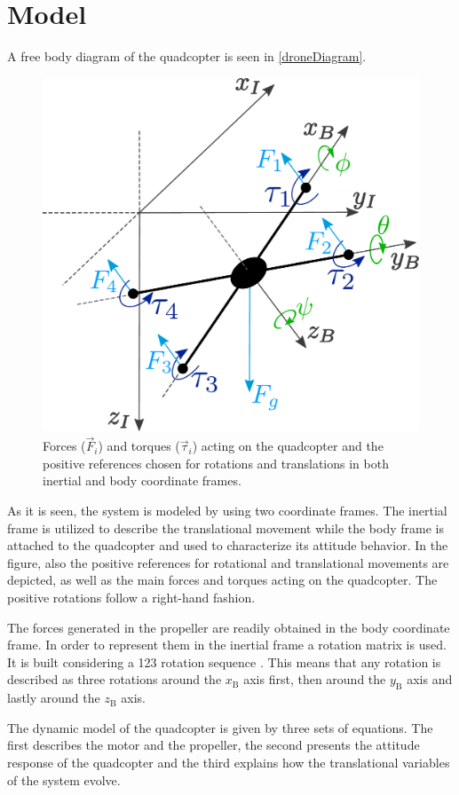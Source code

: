\section{Model}\label{sec:model}
A free body diagram of the quadcopter is seen in \autoref{droneDiagram}. 
\begin{figure}[H]
	\centering
	\includegraphics[width=.4\textwidth]{figures/droneDiagram}
	\caption{Forces ($\vec{F}_i$) and torques ($\vec{\tau}_i$) acting on the quadcopter and the positive references chosen for rotations and translations in both inertial and body coordinate frames.}
	\label{droneDiagram}
\end{figure}
%
As it is seen, the system is modeled by using two coordinate frames. The inertial frame is utilized to describe the translational movement while the body frame is attached to the quadcopter and used to characterize its attitude behavior. In the figure, also the positive references for rotational and translational movements are depicted, as well as the main forces and torques acting on the quadcopter. The positive rotations follow a right-hand fashion.

The forces generated in the propeller are readily obtained in the body coordinate frame. In order to represent them in the inertial frame a rotation matrix is used. It is built considering a 123 rotation sequence \cite{rotationmatrix}. This means that any rotation is described as three rotations around the $x_\mathrm{B}$ axis first, then around the $y_\mathrm{B}$ axis and lastly around the $z_\mathrm{B}$ axis. 
 
The dynamic model of the quadcopter is given by three sets of equations. The first describes the motor and the propeller, the second presents the attitude response of the quadcopter and the third explains how the translational variables of the system evolve.


